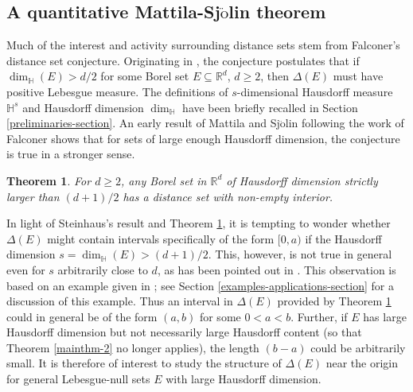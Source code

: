 \documentclass[a4paper,11pt]{amsart}
\newtheorem{theorem}{Theorem}
\numberwithin{equation}{section}
\begin{document}
\subsection{A quantitative Mattila-Sj$\ddot{\text{o}}$lin theorem} 
Much of the interest and activity surrounding distance sets stem from Falconer's distance set conjecture. Originating in \cite{Falconer-1986}, the conjecture postulates that if $\dim_{\mathbb H}(E) > d/2$ for some Borel set $E \subseteq \mathbb R^d$, $d \geq 2$, then $\Delta(E)$ must have positive Lebesgue measure. The definitions of $s$-dimensional Hausdorff measure $\mathbb H^s$ and Hausdorff dimension $\dim_{\mathbb H}$ have been briefly recalled in Section \ref{preliminaries-section}.  An early result of Mattila and Sj$\ddot{\text{o}}$lin \cite{Mattila-Sjolin-99} following the work of Falconer \cite{Falconer-1986} shows that for sets of large enough Hausdorff dimension, the conjecture  is true in a stronger sense.  
\begin{theorem}{\cite{Mattila-Sjolin-99}}\label{mainthm-1} 
For $d \geq 2$, any Borel set in $\mathbb R^d$ of Hausdorff dimension strictly larger than $(d+1)/2$ has a distance set with non-empty interior. 
\end{theorem} 
\noindent In light of Steinhaus's result and Theorem \ref{mainthm-1}, it is tempting to wonder whether $\Delta(E)$ might contain intervals specifically of the form $[0, a)$ if the Hausdorff dimension $s = \dim_{\mathbb H}(E) > (d+1)/2$. This, however, is not true in general even for $s$ arbitrarily close to $d$, as has been  pointed out in \cite{Mattila-Sjolin-99}. This observation is based on an example given in \cite[Theorem 2.4]{Falconer-1986}; see Section \ref{examples-applications-section} for a discussion of this example. Thus an interval in $\Delta(E)$ provided by Theorem \ref{mainthm-1} could in general be of the form $(a, b)$ for some $0 < a < b$. Further, if $E$ has large Hausdorff dimension but not necessarily large Hausdorff content (so that Theorem \ref{mainthm-2} no longer applies), the length $(b-a)$ could be arbitrarily small. It is therefore of interest to study  the structure of $\Delta(E)$ near the origin for general Lebesgue-null sets $E$ with large Hausdorff dimension.  
\vskip0.1in
\end{document}
